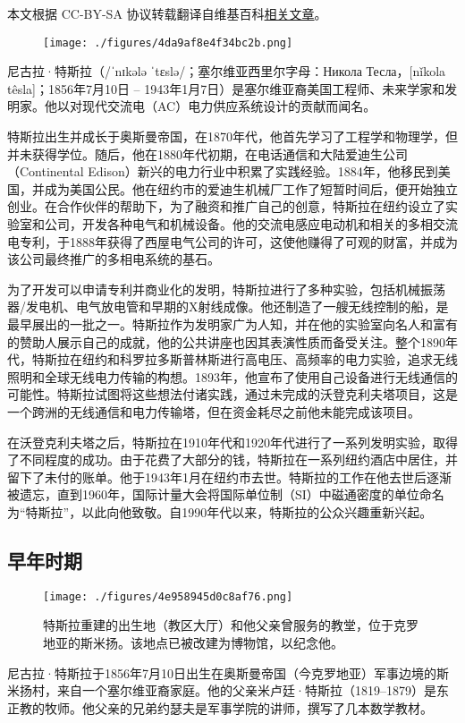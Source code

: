 
本文根据 CC-BY-SA 协议转载翻译自维基百科\href{https://en.wikipedia.org/wiki/Nikola_Tesla}{相关文章}。

\begin{figure}[ht]
\centering
\texttt{[image: ./figures/4da9af8e4f34bc2b.png]}
\caption{} \label{fig_Tesla_1}
\end{figure}
尼古拉·特斯拉（/ˈnɪkələ ˈtɛslə/；塞尔维亚西里尔字母：Никола Тесла，[nǐkola têsla]；1856年7月10日 – 1943年1月7日）是塞尔维亚裔美国工程师、未来学家和发明家。他以对现代交流电（AC）电力供应系统设计的贡献而闻名。

特斯拉出生并成长于奥斯曼帝国，在1870年代，他首先学习了工程学和物理学，但并未获得学位。随后，他在1880年代初期，在电话通信和大陆爱迪生公司（Continental Edison）新兴的电力行业中积累了实践经验。1884年，他移民到美国，并成为美国公民。他在纽约市的爱迪生机械厂工作了短暂时间后，便开始独立创业。在合作伙伴的帮助下，为了融资和推广自己的创意，特斯拉在纽约设立了实验室和公司，开发各种电气和机械设备。他的交流电感应电动机和相关的多相交流电专利，于1888年获得了西屋电气公司的许可，这使他赚得了可观的财富，并成为该公司最终推广的多相电系统的基石。

为了开发可以申请专利并商业化的发明，特斯拉进行了多种实验，包括机械振荡器/发电机、电气放电管和早期的X射线成像。他还制造了一艘无线控制的船，是最早展出的一批之一。特斯拉作为发明家广为人知，并在他的实验室向名人和富有的赞助人展示自己的成就，他的公共讲座也因其表演性质而备受关注。整个1890年代，特斯拉在纽约和科罗拉多斯普林斯进行高电压、高频率的电力实验，追求无线照明和全球无线电力传输的构想。1893年，他宣布了使用自己设备进行无线通信的可能性。特斯拉试图将这些想法付诸实践，通过未完成的沃登克利夫塔项目，这是一个跨洲的无线通信和电力传输塔，但在资金耗尽之前他未能完成该项目。

在沃登克利夫塔之后，特斯拉在1910年代和1920年代进行了一系列发明实验，取得了不同程度的成功。由于花费了大部分的钱，特斯拉在一系列纽约酒店中居住，并留下了未付的账单。他于1943年1月在纽约市去世。特斯拉的工作在他去世后逐渐被遗忘，直到1960年，国际计量大会将国际单位制（SI）中磁通密度的单位命名为“特斯拉”，以此向他致敬。自1990年代以来，特斯拉的公众兴趣重新兴起。
\subsection{早年时期}
\begin{figure}[ht]
\centering
\texttt{[image: ./figures/4e958945d0c8af76.png]}
\caption{特斯拉重建的出生地（教区大厅）和他父亲曾服务的教堂，位于克罗地亚的斯米扬。该地点已被改建为博物馆，以纪念他。} \label{fig_Tesla_2}
\end{figure}
尼古拉·特斯拉于1856年7月10日出生在奥斯曼帝国（今克罗地亚）军事边境的斯米扬村，来自一个塞尔维亚裔家庭。他的父亲米卢廷·特斯拉（1819–1879）是东正教的牧师。他父亲的兄弟约瑟夫是军事学院的讲师，撰写了几本数学教材。


